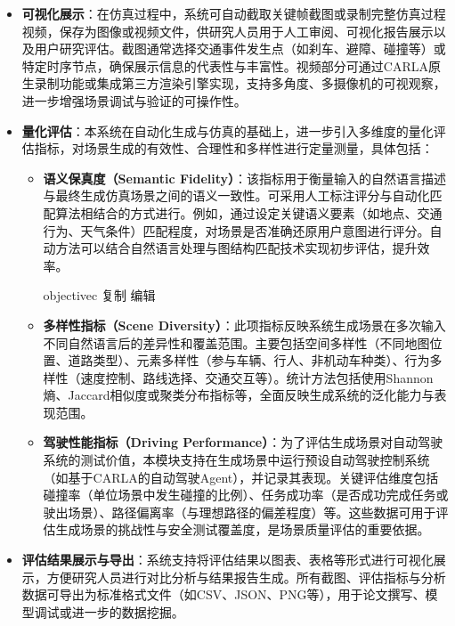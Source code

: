 \begin{itemize}
	\item \textbf{可视化展示}：在仿真过程中，系统可自动截取关键帧截图或录制完整仿真过程视频，保存为图像或视频文件，供研究人员用于人工审阅、可视化报告展示以及用户研究评估。截图通常选择交通事件发生点（如刹车、避障、碰撞等）或特定时序节点，确保展示信息的代表性与丰富性。视频部分可通过CARLA原生录制功能或集成第三方渲染引擎实现，支持多角度、多摄像机的可视观察，进一步增强场景调试与验证的可操作性。
	
	\item \textbf{量化评估}：本系统在自动化生成与仿真的基础上，进一步引入多维度的量化评估指标，对场景生成的有效性、合理性和多样性进行定量测量，具体包括：
	
	\begin{itemize}
		\item \textbf{语义保真度（Semantic Fidelity）}：该指标用于衡量输入的自然语言描述与最终生成仿真场景之间的语义一致性。可采用人工标注评分与自动化匹配算法相结合的方式进行。例如，通过设定关键语义要素（如地点、交通行为、天气条件）匹配程度，对场景是否准确还原用户意图进行评分。自动方法可以结合自然语言处理与图结构匹配技术实现初步评估，提升效率。
		
		objectivec
		复制
		编辑
		\item \textbf{多样性指标（Scene Diversity）}：此项指标反映系统生成场景在多次输入不同自然语言后的差异性和覆盖范围。主要包括空间多样性（不同地图位置、道路类型）、元素多样性（参与车辆、行人、非机动车种类）、行为多样性（速度控制、路线选择、交通交互等）。统计方法包括使用Shannon熵、Jaccard相似度或聚类分布指标等，全面反映生成系统的泛化能力与表现范围。
		
		\item \textbf{驾驶性能指标（Driving Performance）}：为了评估生成场景对自动驾驶系统的测试价值，本模块支持在生成场景中运行预设自动驾驶控制系统（如基于CARLA的自动驾驶Agent），并记录其表现。关键评估维度包括碰撞率（单位场景中发生碰撞的比例）、任务成功率（是否成功完成任务或驶出场景）、路径偏离率（与理想路径的偏差程度）等。这些数据可用于评估生成场景的挑战性与安全测试覆盖度，是场景质量评估的重要依据。
	\end{itemize}
	
	\item \textbf{评估结果展示与导出}：系统支持将评估结果以图表、表格等形式进行可视化展示，方便研究人员进行对比分析与结果报告生成。所有截图、评估指标与分析数据可导出为标准格式文件（如CSV、JSON、PNG等），用于论文撰写、模型调试或进一步的数据挖掘。
	
\end{itemize}